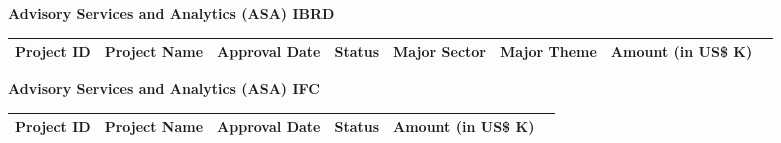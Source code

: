 \documentclass{article}\usepackage[]{graphicx}\usepackage[]{color}
\begin{document}
\begin{minipage}[b]{0.99\textwidth}
\begin{minipage}[b]{0.99\textwidth}
\begin{minipage}[c]{0.99\textwidth}
     \vspace*{0.5cm}
     \end{minipage}
     
     \begin{minipage}[c]{0.99\textwidth} %
     \raggedright{\color{white!30!blue} \textbf{\large Advisory Services and Analytics (ASA) IBRD}}
     \vspace*{0.5cm}
     
\begin{tabular}{l>{\raggedright}p{1in}ll>{\raggedright}p{1in}>{\raggedright}p{1in}rl}
 Project ID & Project Name & Approval Date & Status & Major Sector & Major Theme & Amount (in US\$ K) &  \\ 
  \hline
\end{tabular}

     \vspace*{0.5cm}
     \end{minipage}
     
     \begin{minipage}[c]{0.99\textwidth} %
     \raggedright{\color{white!30!blue} \textbf{\large Advisory Services and Analytics (ASA) IFC}}
     \vspace*{0.5cm}
     
\begin{tabular}{l>{\raggedright}p{2.5in}llrl}
 Project ID & Project Name & Approval Date & Status & Amount (in US\$ K) &  \\ 
  \hline
\end{tabular}

     \vspace*{0.5cm}
     \end{minipage}
     
    \end{minipage}
\end{minipage}
 
\end{document}
